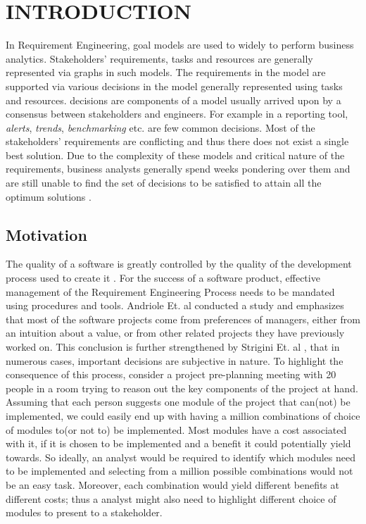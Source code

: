 \chapter{INTRODUCTION}
\label{chap:intro}
In Requirement Engineering, goal models are used to widely to perform business analytics. Stakeholders' requirements, tasks and resources are generally represented via graphs in such models. The requirements in the model are supported via various decisions in the model generally represented using tasks and resources. decisions are components of a model usually arrived upon by a consensus between stakeholders and engineers. For example in a reporting tool, \textit{alerts}, \textit{trends}, \textit{benchmarking} etc. are few common decisions. Most of the stakeholders' requirements are conflicting and thus there does not exist a single best solution. Due to the complexity of these models and critical nature of the requirements, business analysts generally spend weeks pondering over them and are still unable to find the set of decisions to be satisfied to attain all the optimum solutions \cite{korson92}.

\section{Motivation}
\label{sec:intro:motivation}
The quality of a software is greatly controlled by the quality of the development process used to create it \cite{aurum05}. For the success of a software product, effective management of the Requirement Engineering Process needs to be mandated using procedures and tools. Andriole Et. al\cite{andriole98} conducted a study and emphasizes that most of the software projects come from preferences of managers, either from an intuition about a value, or from other related projects they have previously worked on. This conclusion is further strengthened by Strigini Et. al \cite{strigini96}, that in numerous cases, important decisions are subjective in nature. To highlight the consequence of this process, consider a project pre-planning meeting with 20 people in a room trying to reason out the key components of the project at hand. Assuming that each person suggests one module of the project that can(not) be implemented, we could easily end up with having a million combinations of choice of modules to(or not to) be implemented. Most modules have a cost associated with it, if it is chosen to be implemented and a benefit it could potentially yield towards. So ideally, an analyst would be required to identify which modules need to be implemented and selecting from a million possible combinations would not be an easy task. Moreover, each combination would yield different benefits at different costs; thus a analyst might also need to highlight different choice of modules to present to a stakeholder.

